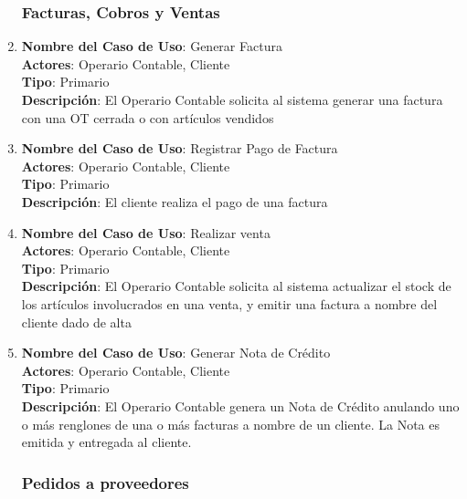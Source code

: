 \documentclass[12pt]{extarticle}
\begin{document}
\begin{spacing}{1.2}
\begin{enumerate}
            \subsubsection{Facturas, Cobros y Ventas}



            \item 	\textbf{Nombre del Caso de Uso}: Generar Factura\\
                    \textbf{Actores}: Operario Contable, Cliente\\
                    \textbf{Tipo}: Primario\\
                    \textbf{Descripción}: El Operario Contable solicita al sistema generar una factura con una OT cerrada o con artículos vendidos

            \item 	\textbf{Nombre del Caso de Uso}: Registrar Pago de Factura\\
                    \textbf{Actores}: Operario Contable, Cliente\\
                    \textbf{Tipo}: Primario\\
                    \textbf{Descripción}: El cliente realiza el pago de una factura
            
            \item 	\textbf{Nombre del Caso de Uso}: Realizar venta\\
                    \textbf{Actores}: Operario Contable, Cliente\\
                    \textbf{Tipo}: Primario\\
                    \textbf{Descripción}: El Operario Contable solicita al sistema actualizar el stock de los artículos involucrados en una venta, y emitir una factura a nombre del cliente dado de alta

            \item 	\textbf{Nombre del Caso de Uso}: Generar Nota de Crédito\\
                    \textbf{Actores}: Operario Contable, Cliente\\
                    \textbf{Tipo}: Primario\\
                    \textbf{Descripción}: El Operario Contable genera un Nota de Crédito anulando uno o más renglones de una o más facturas a nombre de un cliente. La Nota es emitida y entregada al cliente.



            \subsubsection{Pedidos a proveedores}




\end{enumerate}
\end{spacing}
\end{document}
